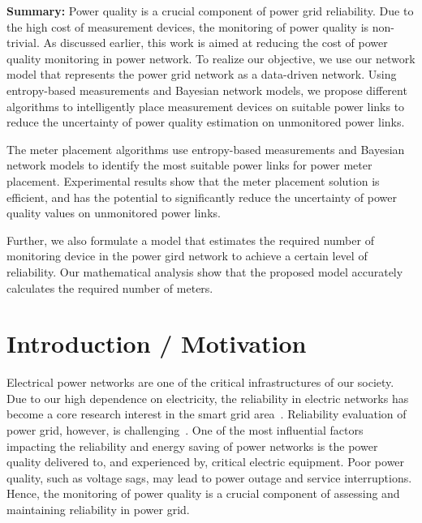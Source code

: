\label{chap:meterPlacement}

\small
\textbf{Summary:} Power quality is a crucial component of power grid reliability. Due to the high cost of measurement devices, the monitoring of power quality is non-trivial. As discussed earlier, this work is aimed at reducing the cost of power quality monitoring in power network. To realize our objective, we use our network model that represents the power grid network as a data-driven network. Using entropy-based measurements and Bayesian network models, we propose different algorithms to intelligently place measurement devices on suitable power links to reduce the uncertainty of power quality estimation on unmonitored power links.

The meter placement algorithms use entropy-based measurements and Bayesian network models to identify the most suitable power links for power meter placement. Experimental results show that the meter placement solution is efficient, and has the potential to significantly reduce the uncertainty of power quality values on unmonitored power links.

Further, we also formulate a model that estimates the required number of monitoring device in the power gird network to achieve a certain level of reliability. Our mathematical analysis show that the proposed model accurately calculates the required number of meters.

\small
\setlength{\nomitemsep}{-0.1em}
\printnomenclature

\normalsize
\section{Introduction / Motivation}
Electrical power networks are one of the critical infrastructures of our society. Due to our high dependence on electricity, the reliability in electric networks has become a core research interest in the smart grid area~\cite{Moslehim10}. Reliability evaluation of power grid, however, is challenging~\cite{Albert04}. One of the most influential factors impacting the reliability and energy saving of power networks is the power quality delivered to, and experienced by, critical electric equipment. Poor power quality, such as voltage sags, may lead to power outage and service interruptions. Hence, the monitoring of power quality is a crucial component of assessing and maintaining reliability in power grid.

